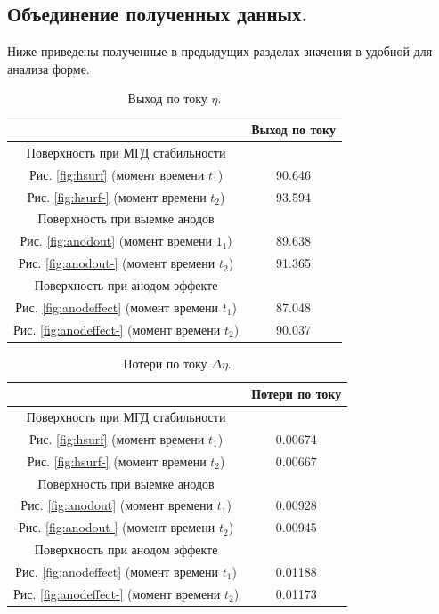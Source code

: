 \documentclass{article}
\begin{document}
\subsection{Объединение полученных данных.}

Ниже приведены полученные в предыдущих разделах значения в удобной для анализа форме.

\begin{table}[ht]
\centering
\begin{tabular}{|c|c|}
\hline
			&Выход по току	\\
\hline
Поверхность при МГД стабильности &	\\
Рис. \ref{fig:hsurf} (момент времени $t_1$)			&90.646	\\ 
Рис. \ref{fig:hsurf-} (момент времени $t_2$)		&93.594	\\  
\hline
Поверхность при выемке анодов &	\\
Рис. \ref{fig:anodout} (момент времени $1_1$)		&89.638	\\  
Рис. \ref{fig:anodout-} (момент времени $t_2$)		&91.365	\\  
\hline
Поверхность при анодом эффекте &	\\
Рис. \ref{fig:anodeffect} (момент времени $t_1$)	&87.048	\\  
Рис. \ref{fig:anodeffect-} (момент времени $t_2$)	&90.037	\\  
\hline
\end{tabular}
\caption{Выход по току $\eta$. \label{table:vichPoToku}}
\end{table}

\begin{table}[ht]
\centering
\begin{tabular}{|c|c|}
\hline
			&Потери по току	\\
\hline
Поверхность при МГД стабильности &	\\
Рис. \ref{fig:hsurf} (момент времени $t_1$)			&0.00674\\ 
Рис. \ref{fig:hsurf-} (момент времени $t_2$)		&0.00667\\  
\hline
Поверхность при выемке анодов &	\\
Рис. \ref{fig:anodout} (момент времени $t_1$)		&0.00928\\  
Рис. \ref{fig:anodout-} (момент времени $t_2$)		&0.00945\\  
\hline
Поверхность при анодом эффекте &	\\
Рис. \ref{fig:anodeffect} (момент времени $t_1$)	&0.01188\\  
Рис. \ref{fig:anodeffect-} (момент времени $t_2$)	&0.01173\\  
\hline
\end{tabular}
\caption{Потери по току $\Delta \eta$. \label{table:poteriPoToku}}
\end{table}
\end{document}
